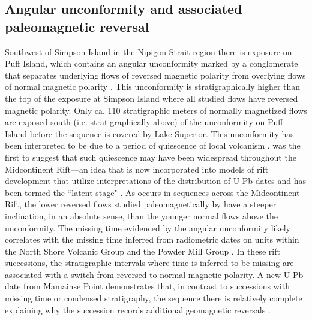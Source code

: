 \documentclass[draft,gc]{AGUTeX}
\begin{document}
\begin{article}
\subsection{Angular unconformity and associated paleomagnetic reversal}

Southwest of Simpson Island in the Nipigon Strait region there is exposure on Puff Island, which contains an angular unconformity marked by a conglomerate that separates underlying flows of reversed magnetic polarity from overlying flows of normal magnetic polarity \citep{Halls1974a}. This unconformity is stratigraphically higher than the top of the exposure at Simpson Island where all studied flows have reversed magnetic polarity. Only ca. 110 stratigraphic meters of normally magnetized flows are exposed south (i.e. stratigraphically above) of the unconformity on Puff Island before the sequence is covered by Lake Superior. This unconformity has been interpreted to be due to a period of quiescence of local volcanism \citep{Halls1974a}. \citet{Halls1974a} was the first to suggest that such quiescence may have been widespread throughout the Midcontinent Rift---an idea that is now incorporated into models of rift development that utilize interpretations of the distribution of U-Pb dates and has been termed the ``latent stage" \citep{Vervoort2007a}. As occurs in sequences across the Midcontinent Rift, the lower reversed flows studied paleomagnetically by \citet{Halls1974a} have a steeper inclination, in an absolute sense, than the younger normal flows above the unconformity. The missing time evidenced by the angular unconformity likely correlates with the missing time inferred from radiometric dates on units within the North Shore Volcanic Group and the Powder Mill Group \citep{Davis1997a, Zartman1997a}. In these rift successions, the stratigraphic intervals where time is inferred to be missing are associated with a switch from reversed to normal magnetic polarity. A new U-Pb date from Mamainse Point demonstrates that, in contrast to successions with missing time or condensed stratigraphy, the sequence there is relatively complete explaining why the succession records additional geomagnetic reversals \citep{Swanson-Hysell2014a}. 

%
%
%


\end{article}
\end{document}
